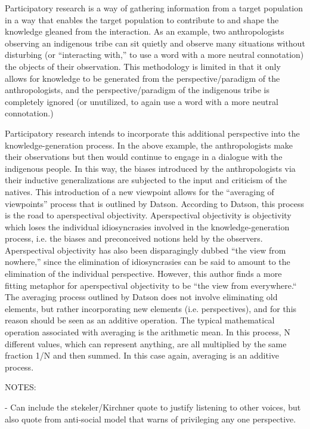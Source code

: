 \documentclass{lps}
\begin{document}
Participatory research is a way of gathering information from a target
population in a way that enables the target population to contribute to and
shape the knowledge gleaned from the interaction. As an example, two
anthropologists observing an indigenous tribe can sit quietly and observe many
situations without disturbing (or ``interacting with,'' to use a word with a
more neutral connotation) the objects of their observation. This methodology
is limited in that it only allows for knowledge to be generated from the
perspective/paradigm of the anthropologists, and the perspective/paradigm of
the indigenous tribe is completely ignored (or unutilized, to again use a word
with a more neutral connotation.)

Participatory research intends to incorporate this additional perspective into
the knowledge-generation process. In the above example, the anthropologists
make their observations but then would continue to engage in a dialogue with
the indigenous people. In this way, the biases introduced by the
anthropologists via their inductive generalizations are subjected to the input
and criticism of the natives. This introduction of a new viewpoint allows for
the ``averaging of viewpoints'' process that is outlined by Datson. According
to Datson, this process is the road to aperspectival objectivity.
Aperspectival objectivity is objectivity which loses the individual
idiosyncrasies involved in the knowledge-generation process, i.e. the biases
and preconceived notions held by the observers. Aperspectival objectivity has
also been disparagingly dubbed ``the view from nowhere,'' since the
elimination of idiosyncrasies can be said to amount to the elimination of the
individual perspective. However, this author finds a more fitting metaphor for
aperspectival objectivity to be ``the view from everywhere.`` The averaging
process outlined by Datson does not involve eliminating old elements, but
rather incorporating new elements (i.e.  perspectives), and for this reason
should be seen as an additive operation.  The typical mathematical operation
associated with averaging is the arithmetic mean. In this process, N different
values, which can represent anything, are all multiplied by the same fraction
1/N and then summed. In this case again, averaging is an additive process.


NOTES:

- Can include the stekeler/Kirchner quote to justify listening to other
voices, but also quote from anti-social model that warns of privileging any
one perspective.
\end{document}
